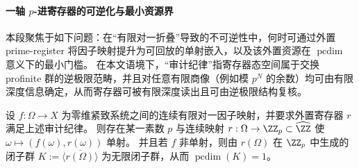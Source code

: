 \paragraph{一轴 \texorpdfstring{$p$}{p}-进寄存器的可逆化与最小资源界}
本段聚焦于如下问题：在“有限对一折叠”导致的不可逆性中，何时可通过外置 prime-register 将因子映射提升为可回放的单射嵌入，以及该外置资源在 \(\operatorname{pcdim}\) 意义下的最小门槛。
在本文语境下，“审计纪律”指寄存器态空间属于交换 profinite 群的逆极限范畴，并且对任意有限商像（例如模 \(p^N\) 的余数）均可由有限深度信息确定，从而寄存器可被有限深度读出且可由逆极限结构复核。
\par
\begin{conjecture}[一轴 prime-register 的普适可实现性与 \texorpdfstring{$\operatorname{pcdim}=1$}{pcdim=1} 资源阈值]\label{conj:conclusion-uniaxial-prime-register-universality}
设 \(f:\Omega\to X\) 为零维紧致系统之间的连续有限对一因子映射，并要求外置寄存器 \(r\) 满足上述审计纪律。
则存在某一素数 \(p\) 与连续映射 \(r:\Omega\to \ZZ_p\subset \widehat{\ZZ}\) 使 \(\omega\mapsto (f(\omega),r(\omega))\) 单射。
并且若 \(f\) 非单射，则由 \(r(\Omega)\) 在 \(\ZZ_p\) 中生成的闭子群
\(
K:=\overline{\langle r(\Omega)\rangle}
\)
为无限闭子群，从而 \(\operatorname{pcdim}(K)=1\)。
\end{conjecture}

